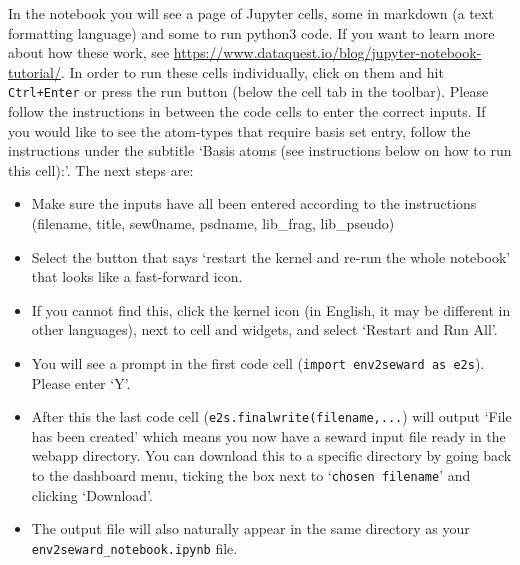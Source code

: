 \documentclass[10pt]{article}
\begin{document}
In the notebook you will see a page of Jupyter cells, some in markdown (a text formatting language) and some to run python3 code. If you want to learn more about how these work, see \url{https://www.dataquest.io/blog/jupyter-notebook-tutorial/}. In order to run these cells individually, click on them and hit \texttt{Ctrl+Enter} or press the run button (below the cell tab in the toolbar). Please follow the instructions in between the code cells to enter the correct inputs.
If you would like to see the atom-types that require basis set entry, follow the instructions under the subtitle `Basis atoms (see instructions below on how to run this cell):'. The next steps are:

\begin{itemize}
	\item Make sure the inputs have all been entered according to the instructions (filename, title, sew0name, psdname, lib\_frag, lib\_pseudo)
	\item Select the button that says `restart the kernel and re-run the whole notebook' that looks like a fast-forward icon.
	\item If you cannot find this, click the kernel icon (in English, it may be different in other languages), next to cell and widgets, and select `Restart and Run All'.
	\item You will see a prompt in the first code cell (\texttt{import env2seward as e2s}). Please enter `Y'.
	\item After this the last code cell (\texttt{e2s.finalwrite(filename,...}) will output `File has been created' which means you now have a seward input file ready in the webapp directory. You can download this to a specific directory by going back to the dashboard menu, ticking the box next to `\texttt{chosen filename}' and clicking `Download'.
	\item The output file will also naturally appear in the same directory as your \texttt{env2seward\_notebook.ipynb} file.
\end{itemize}

\end{document}
